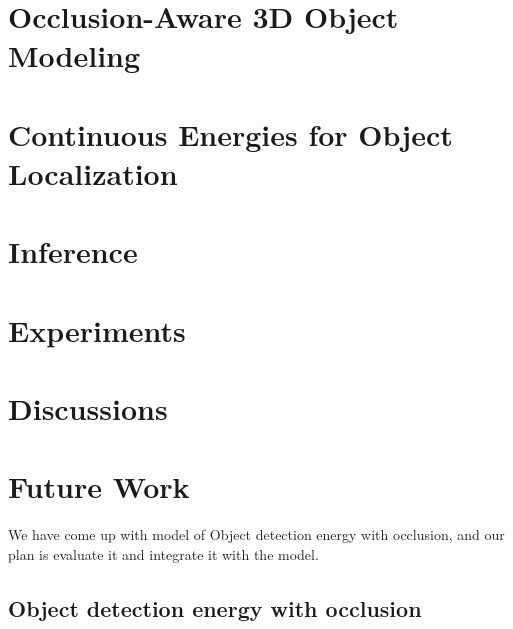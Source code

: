 \documentclass[letterpaper]{report}
\begin{document}
\chapter{Occlusion-Aware 3D Object Modeling}
\label{sec:TPmodel}

\chapter{Continuous Energies for Object Localization}


%
\chapter{Inference}


%
\chapter{Experiments}

% 
\chapter{Discussions}


\chapter{Future Work}

We have come up with model of Object detection energy with occlusion, and our plan is evaluate it
and integrate it with the model.

\section{Object detection energy with occlusion} 
\end{document}

